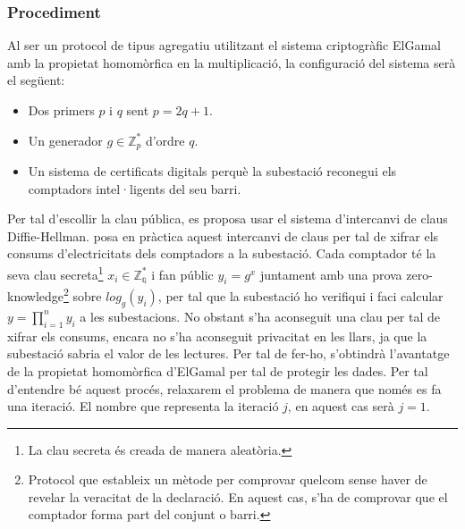 \subsubsection{Procediment}
Al ser un protocol de tipus agregatiu utilitzant el sistema criptogràfic ElGamal amb la propietat homomòrfica en la multiplicació, la configuració del sistema serà el següent:
\begin{itemize}
	\item Dos primers $p$ i $q$ sent $p = 2q+1$.
	\item Un generador $g \in \mathbb{Z}_p^*$ d'ordre $q$.
	\item Un sistema de certificats digitals perquè la subestació reconegui els comptadors intel·ligents del seu barri.
\end{itemize}
Per tal d'escollir la clau pública, es proposa usar el sistema d'intercanvi de claus Diffie-Hellman. \cite{busom} posa en pràctica aquest intercanvi de claus per tal de xifrar els consums d'electricitats dels comptadors a la subestació. Cada comptador té la seva clau secreta\footnote{La clau secreta és creada de manera aleatòria.} $x_i \in \mathbb{Z_q^*} $ i fan públic $y_i = g^x$ juntament amb una prova zero-knowledge\footnote{Protocol que estableix un mètode per comprovar quelcom sense haver de revelar la veracitat de la declaració. En aquest cas, s'ha de comprovar que el comptador forma part del conjunt o barri.} sobre $log_g(y_i)$, per tal que la subestació ho verifiqui i faci calcular $y = \prod_{i=1}^{n} y_i$ a les subestacions.
No obstant s'ha aconseguit una clau per tal de xifrar els consums, encara no s'ha aconseguit privacitat en les llars, ja que la subestació sabria el valor de les lectures. Per tal de fer-ho, s'obtindrà l'avantatge de la propietat homomòrfica d'ElGamal per tal de protegir les dades. Per tal d'entendre bé aquest procés, relaxarem el problema de manera que només es fa una iteració. El nombre que representa la iteració $j$, en aquest cas serà $j = 1$.
